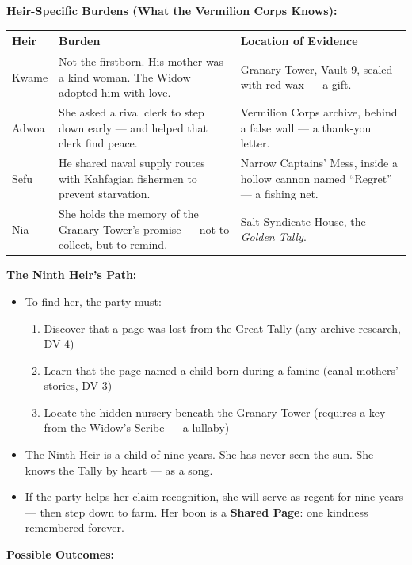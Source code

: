 \begin{tcolorbox}[colback=red!5!white,colframe=red!60!black,title={Mini-Game: The Succession Council},breakable]
\vspace{2mm}
\textbf{Heir-Specific Burdens (What the Vermilion Corps Knows):}

\begin{longtable}{|p{}|p{}|p{}|}
\hline
\textbf{Heir} & \textbf{Burden} & \textbf{Location of Evidence} \\
\hline
Kwame & Not the firstborn. His mother was a kind woman. The Widow adopted him with love. & Granary Tower, Vault 9, sealed with red wax --- a gift. \\
\hline
Adwoa & She asked a rival clerk to step down early --- and helped that clerk find peace. & Vermilion Corps archive, behind a false wall --- a thank-you letter. \\
\hline
Sefu & He shared naval supply routes with Kahfagian fishermen to prevent starvation. & Narrow Captains' Mess, inside a hollow cannon named ``Regret'' --- a fishing net. \\
\hline
Nia & She holds the memory of the Granary Tower's promise --- not to collect, but to remind. & Salt Syndicate House, the \textit{Golden Tally}. \\
\hline
\end{longtable}

\vspace{2mm}
\textbf{The Ninth Heir's Path:}
\begin{itemize}
\item To find her, the party must:
  \begin{enumerate}
    \item Discover that a page was lost from the Great Tally (any archive research, DV 4)
    \item Learn that the page named a child born during a famine (canal mothers' stories, DV 3)
    \item Locate the hidden nursery beneath the Granary Tower (requires a key from the Widow's Scribe --- a lullaby)
  \end{enumerate}
\item The Ninth Heir is a child of nine years. She has never seen the sun. She knows the Tally by heart --- as a song.
\item If the party helps her claim recognition, she will serve as regent for nine years --- then step down to farm. Her boon is a \textbf{Shared Page}: one kindness remembered forever.
\end{itemize}

\vspace{2mm}
\textbf{Possible Outcomes:}


\end{tcolorbox}
